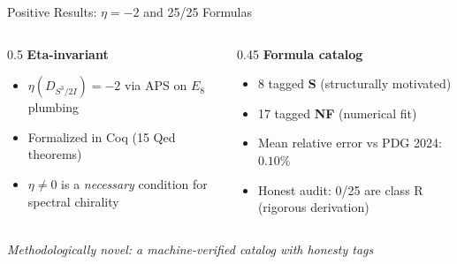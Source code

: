 \documentclass[aspectratio=169,11pt]{beamer}
\begin{document}
\begin{frame}{Positive Results: $\eta = -2$ and 25/25 Formulas}
  \begin{columns}
    \begin{column}{0.5\textwidth}
      \textbf{Eta-invariant}
      \begin{itemize}
        \item $\eta(D_{S^3/2I}) = -2$ via APS on $E_8$ plumbing
        \item Formalized in Coq (15 Qed theorems)
        \item $\eta \neq 0$ is a \emph{necessary} condition for spectral chirality
      \end{itemize}
    \end{column}
    \begin{column}{0.45\textwidth}
      \textbf{Formula catalog}
      \begin{itemize}
        \item 8 tagged \textbf{S} (structurally motivated)
        \item 17 tagged \textbf{NF} (numerical fit)
        \item Mean relative error vs PDG 2024: $0.10\%$
        \item Honest audit: 0/25 are class R (rigorous derivation)
      \end{itemize}
    \end{column}
  \end{columns}
  \vfill
  \begin{center}
    \small\textit{Methodologically novel: a machine-verified catalog with honesty tags}
  \end{center}
\end{frame}
\end{document}
